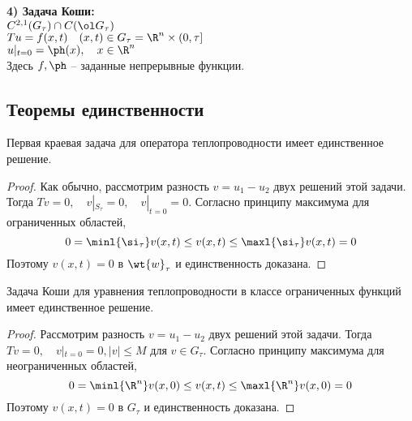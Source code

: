 \documentclass[a4paper,draft]{article}
\begin{document}
\textbf{4) Задача Коши:}\\
$C^{2,1}(G_\tau)\cap C(\ol G_\tau)$\\
$Tu=f(x,t)\quad (x,t)\in G_\tau=\R^n \times(0,\tau] $\\
$u|_{t=0}=\ph(x),\quad x\in \R^n$\\
Здесь $f,\ph$ -- заданные непрерывные функции.

\subsection{Теоремы единственности}

\begin{theorem}
Первая краевая задача для оператора теплопроводности имеет
единственное решение.
\end{theorem}
\begin{proof}
Как обычно, рассмотрим разность $v=u_1-u_2$ двух решений этой
задачи. Тогда $Tv=0,\quad v|_{S_\tau}=0,\quad v|_{t=0}=0$.
Согласно принципу максимума для ограниченных областей,
$$
0=\minl{\si_\tau} v(x,t)\le v(x,t)\le \maxl{\si_\tau}
v(x,t)=0
$$
Поэтому $v(x,t)=0$ в $\wt{w}_\tau$ и единственность доказана.
\end{proof}

\begin{theorem}
Задача Коши для уравнения теплопроводности в классе ограниченных функций имеет единственное решение.
\end{theorem}
\begin{proof}
Рассмотрим разность $v=u_1-u_2$ двух решений этой задачи. Тогда
$Tv=0, \quad v|_{t=0}=0, |v|\le M$ для $v\in G_\tau$. Согласно
принципу максимума для неограниченных областей,
$$
0=\minl{\R^n} v(x,0)\le v(x,t)\le \maxl{\R^n}
v(x,0)=0
$$
Поэтому $v(x,t)=0$ в $G_\tau$ и единственность доказана.
\end{proof}
\end{document}
